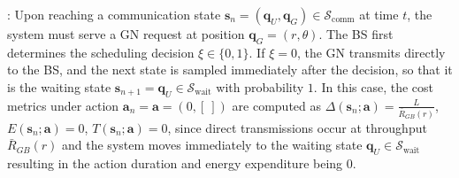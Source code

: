 \documentclass[12pt, draftcls, onecolumn]{IEEEtran}
\theoremstyle{plain}
\theoremstyle{definition}
\theoremstyle{remark}
\begin{document}
:
Upon reaching a communication state $\mathbf{s}_{n}{=}(\mathbf{q}_{U},\mathbf{q}_{G}){\in}\mathcal{S}_{\mathrm{comm}}$ at time $t$, the system must serve a GN request at position $\mathbf{q}_{G}=(r,\theta)$. The BS first determines the scheduling decision $\xi{\in}\{0,1\}$. If $\xi{=}0$, the GN transmits directly to the BS, and the next state is sampled immediately after the decision, so that it is the waiting state $\mathbf{s}_{n{+}1}{=}\mathbf{q}_{U}{\in}\mathcal{S}_{\mathrm{wait}}$ with probability $1$. In this case, the cost metrics under action $\mathbf{a}_{n}{=}\mathbf{a}{=}(0,[\ ])$ are computed as $\Delta(\mathbf{s}_{n};\mathbf{a}){=}\frac{L}{\bar R_{GB}(r)}$, $E(\mathbf{s}_{n};\mathbf{a}){=}0$, $T(\mathbf{s}_{n};\mathbf{a}){=}0$, since direct transmissions occur at throughput $\bar{R}_{GB}(r)$ and the system moves immediately to the waiting state $\mathbf{q}_{U}{\in}\mathcal{S}_{\mathrm{wait}}$ resulting in the action duration and energy expenditure being $0$. 
\end{document}
